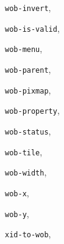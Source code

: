 \begin{theindex}
\item {\tt wob-invert}, {\bf\pageref{wob-invert}}
\item {\tt wob-is-valid}, {\bf\pageref{wob-is-valid}}
\item {\tt wob-menu}, {\bf\pageref{wob-menu}}
\item {\tt wob-parent}, {\bf\pageref{wob-parent}}
\item {\tt wob-pixmap}, {\bf\pageref{wob-pixmap}}
\item {\tt wob-property}, {\bf\pageref{wob-property}}
\item {\tt wob-status}, {\bf\pageref{wob-status}}
\item {\tt wob-tile}, {\bf\pageref{wob-tile}}
\item {\tt wob-width}, {\bf\pageref{wob-width}}
\item {\tt wob-x}, {\bf\pageref{wob-x}}
\item {\tt wob-y}, {\bf\pageref{wob-y}}
\item {\tt xid-to-wob}, {\bf\pageref{xid-to-wob}}
\end{theindex}
